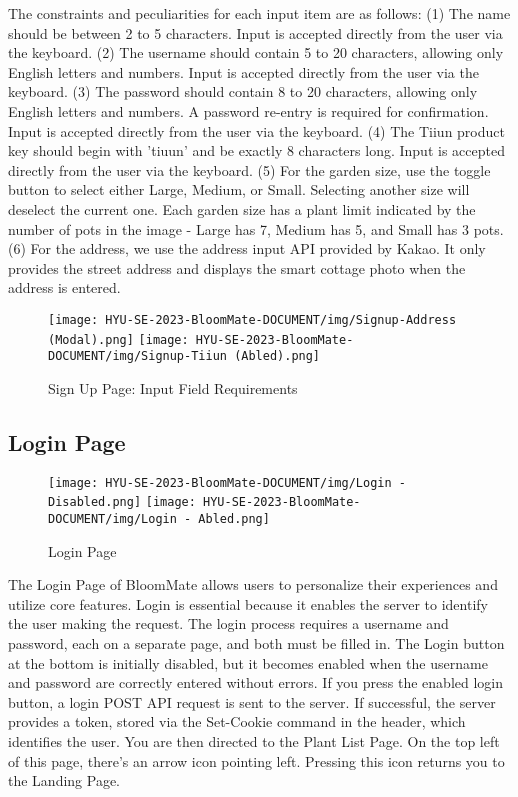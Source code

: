 \documentclass[conference, a4paper]{IEEEtran}
\begin{document}
The constraints and peculiarities for each input item are as follows: (1) The name should be between 2 to 5 characters. Input is accepted directly from the user via the keyboard. (2) The username should contain 5 to 20 characters, allowing only English letters and numbers. Input is accepted directly from the user via the keyboard. (3) The password should contain 8 to 20 characters, allowing only English letters and numbers. A password re-entry is required for confirmation. Input is accepted directly from the user via the keyboard. (4) The Tiiun product key should begin with 'tiuun' and be exactly 8 characters long. Input is accepted directly from the user via the keyboard. (5) For the garden size, use the toggle button to select either Large, Medium, or Small. Selecting another size will deselect the current one. Each garden size has a plant limit indicated by the number of pots in the image - Large has 7, Medium has 5, and Small has 3 pots. (6) For the address, we use the address input API provided by Kakao. It only provides the street address and displays the smart cottage photo when the address is entered.

    \begin{figure}[h]
    \centerline{
        \texttt{[image: HYU-SE-2023-BloomMate-DOCUMENT/img/Signup-Address (Modal).png]}
        \texttt{[image: HYU-SE-2023-BloomMate-DOCUMENT/img/Signup-Tiiun (Abled).png]}
    }
    \label{fig}
    \caption{Sign Up Page: Input Field Requirements}
    \end{figure}
    

\subsection{Login Page}
    \begin{figure}[h]
    \centerline{
        \texttt{[image: HYU-SE-2023-BloomMate-DOCUMENT/img/Login - Disabled.png]}
        \texttt{[image: HYU-SE-2023-BloomMate-DOCUMENT/img/Login - Abled.png]}
    }
    \label{fig}
    \caption{Login Page}
    \end{figure}
The Login Page of BloomMate allows users to personalize their experiences and utilize core features. Login is essential because it enables the server to identify the user making the request. The login process requires a username and password, each on a separate page, and both must be filled in. The Login button at the bottom is initially disabled, but it becomes enabled when the username and password are correctly entered without errors. If you press the enabled login button, a login POST API request is sent to the server. If successful, the server provides a token, stored via the Set-Cookie command in the header, which identifies the user. You are then directed to the Plant List Page. On the top left of this page, there's an arrow icon pointing left. Pressing this icon returns you to the Landing Page.
\end{document}
